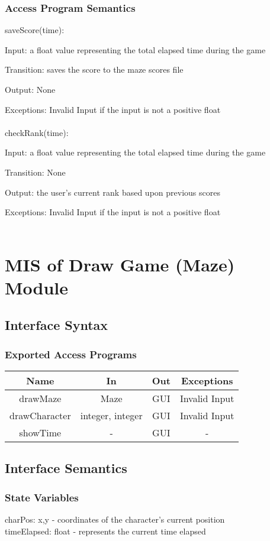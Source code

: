 \documentclass[12pt, titlepage]{article}
\begin{document}
		\subsubsection{Access Program Semantics}
		saveScore(time):
		
		Input: a float value representing the total elapsed time during the game
		
		Transition: saves the score to the maze scores file
		
		Output: None
		
		Exceptions: Invalid Input if the input is not a positive float \\
		\\
		checkRank(time):
		
		Input: a float value representing the total elapsed time during the game
		
		Transition: None
		
		Output: the user's current rank based upon previous scores
		
		Exceptions: Invalid Input if the input is not a positive float\\
		\\

\section{MIS of Draw Game (Maze) Module}
		\subsection{Interface Syntax}
		\subsubsection{Exported Access Programs}
		\begin{tabular}[pos]{|c|c|c|c|}
			\hline
			\textbf{Name}& \textbf{In} & \textbf{Out} & \textbf{Exceptions} \\ \hline
			drawMaze & Maze & GUI & Invalid Input \\ \hline
			drawCharacter & integer, integer & GUI & Invalid Input \\ \hline
			showTime & - & GUI & - \\ \hline
		\end{tabular}
		
		\subsection{Interface Semantics}
		\subsubsection{State Variables}
		charPos: x,y - coordinates of the character's current position\\
		timeElapsed: float - represents the current time elapsed
\end{document}
